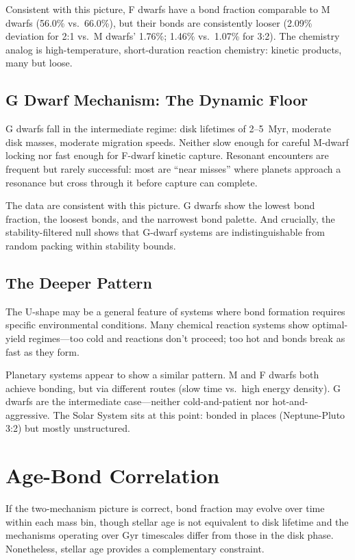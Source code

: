 \documentclass[twocolumn]{aastex631}
\begin{document}
Consistent with this picture, F dwarfs have a bond fraction comparable to M
dwarfs (56.0\% vs.\ 66.0\%), but their bonds are consistently looser (2.09\%
deviation for 2:1 vs.\ M dwarfs' 1.76\%; 1.46\% vs.\ 1.07\% for 3:2). The
chemistry analog is high-temperature, short-duration reaction chemistry:
kinetic products, many but loose.

\subsection{G Dwarf Mechanism: The Dynamic Floor}

G dwarfs fall in the intermediate regime: disk lifetimes of 2--5~Myr, moderate
disk masses, moderate migration speeds. Neither slow enough for careful M-dwarf
locking nor fast enough for F-dwarf kinetic capture. Resonant encounters are
frequent but rarely successful: most are ``near misses'' where planets approach
a resonance but cross through it before capture can complete.

The data are consistent with this picture. G dwarfs show the lowest bond
fraction, the loosest bonds, and the narrowest bond palette. And crucially, the
stability-filtered null shows that G-dwarf systems are indistinguishable from
random packing within stability bounds.

\subsection{The Deeper Pattern}

The U-shape may be a general feature of systems where bond formation requires
specific environmental conditions. Many chemical reaction systems show
optimal-yield regimes---too cold and reactions don't proceed; too hot and
bonds break as fast as they form.

Planetary systems appear to show a similar pattern. M and F dwarfs both achieve
bonding, but via different routes (slow time vs.\ high energy density). G dwarfs
are the intermediate case---neither cold-and-patient nor hot-and-aggressive.
The Solar System sits at this point: bonded in places (Neptune-Pluto 3:2) but
mostly unstructured.

\section{Age-Bond Correlation}
\label{sec:agebond}

If the two-mechanism picture is correct, bond fraction may evolve over time
within each mass bin, though stellar age is not equivalent to disk lifetime and
the mechanisms operating over Gyr timescales differ from those in the disk
phase. Nonetheless, stellar age provides a complementary constraint.
\end{document}
